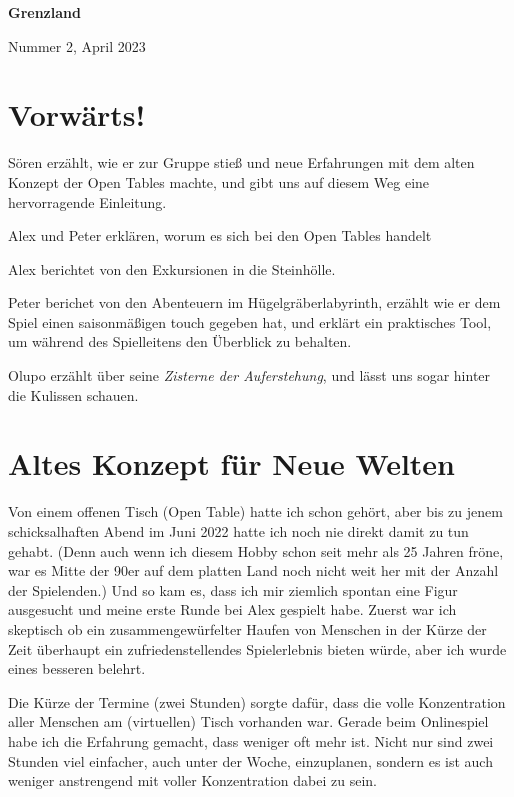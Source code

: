 \documentclass[11pt]{wbzine}
\begin{document}


\shipout\null
\addtocounter{page}{-1}

{\bfseries\fontsize{70}{55}
 \selectfont Grenzland \par}%
 \hrulefill
 Nummer 2, April 2023

\tableofcontents

\begin{multicols}{2}

\section{Vorwärts!}

Sören erzählt, wie er zur Gruppe stieß und neue Erfahrungen mit dem
    alten Konzept der Open Tables machte, und gibt uns auf diesem
    Weg eine hervorragende Einleitung.

Alex und Peter erklären, worum es sich bei den Open Tables handelt

Alex berichtet von den Exkursionen in die Steinhölle.

Peter berichet von den Abenteuern im Hügelgräberlabyrinth, erzählt
    wie er dem Spiel einen saisonmäßigen touch gegeben hat, und
    erklärt ein praktisches Tool, um während des Spielleitens den
    Überblick zu behalten.

    Olupo erzählt über seine \textit{Zisterne der Auferstehung}, und
    lässt uns sogar hinter die Kulissen schauen.




\section{Altes Konzept für Neue Welten}
Von einem offenen Tisch (Open Table) hatte ich schon gehört, aber bis
zu jenem schicksalhaften Abend im Juni 2022 hatte ich noch nie direkt
damit zu tun gehabt. (Denn auch wenn ich diesem Hobby schon seit mehr
als 25 Jahren fröne, war es Mitte der 90er auf dem platten Land noch
nicht weit her mit der Anzahl der Spielenden.) Und so kam es, dass ich
mir ziemlich spontan eine Figur ausgesucht und meine erste Runde bei Alex
gespielt habe. Zuerst war ich skeptisch ob ein zusammengewürfelter Haufen
von Menschen in der Kürze der Zeit überhaupt ein zufriedenstellendes
Spielerlebnis bieten würde, aber ich wurde eines besseren belehrt.

Die Kürze der Termine (zwei Stunden) sorgte dafür, dass die volle
Konzentration aller Menschen am (virtuellen) Tisch vorhanden war. Gerade
beim Onlinespiel habe ich die Erfahrung gemacht, dass weniger oft
mehr ist. Nicht nur sind zwei Stunden viel einfacher, auch unter der
Woche, einzuplanen, sondern es ist auch weniger anstrengend mit voller
Konzentration dabei zu sein.


\end{multicols}
\end{document}
